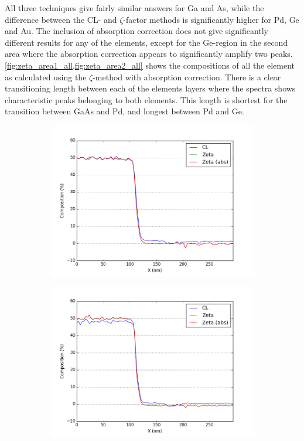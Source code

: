 All three techniques give fairly similar answers for Ga and As, while the difference between the CL- and $\zeta$-factor methods is significantly higher for Pd, Ge and Au. The inclusion of absorption correction does not give significantly different results for any of the elements, except for the Ge-region in the second area where the absorption correction appears to significantly amplify two peaks. \cref{fig:zeta_area1_all,fig:zeta_area2_all} shows the compositions of all the element as calculated using the $\zeta$-method with absorption correction. There is a clear transitioning length between each of the elements layers where the spectra shows characteristic peaks belonging to both elements. This length is shortest for the transition between GaAs and Pd, and longest between Pd and Ge.

\begin{figure}
	\begin{subfigure}{.5\textwidth}
		\centering
		\includegraphics[width=\linewidth]{fig/q/1_ga_nm}
		\caption{}
		\label{fig:zeta_area1_ga}
	\end{subfigure}%
	\begin{subfigure}{.5\textwidth}
		\centering
		\includegraphics[width=\linewidth]{fig/q/1_as_nm}

\end{subfigure}
\end{figure}
